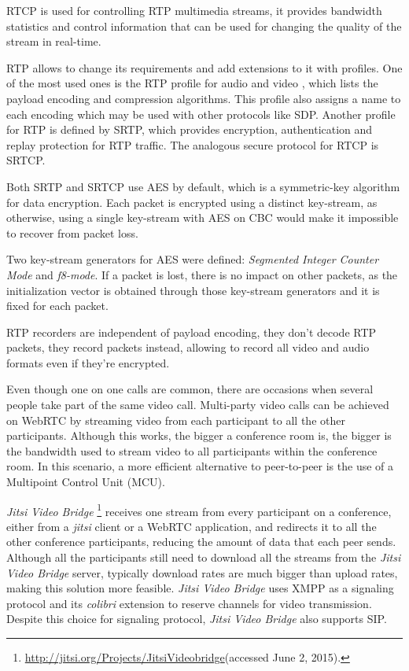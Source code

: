 \ac{RTCP} is used for controlling \ac{RTP} multimedia streams, it provides bandwidth statistics and control information that can be used for changing the quality of the stream in real-time.

  \ac{RTP} allows to change its requirements and add extensions to it with profiles. One of the most used ones is the \ac{RTP} profile for audio and video \cite{rfc3551}, which lists the payload encoding and compression algorithms. This profile also assigns a name to each encoding which may be used with other protocols like \ac{SDP}.
  Another profile for \ac{RTP} is defined by \ac{SRTP}, which provides encryption, authentication and replay protection for \ac {RTP} traffic. The analogous secure protocol for \ac{RTCP} is \ac{SRTCP}.

  Both \ac{SRTP} and \ac{SRTCP} use \ac{AES} by default, which is a symmetric-key algorithm for data encryption. Each packet is encrypted using a distinct key-stream, as otherwise, using a single key-stream with \ac{AES} on \ac{CBC} would make it impossible to recover from packet loss.

  Two key-stream generators for \ac{AES} were defined: \emph{Segmented Integer Counter Mode} and \emph{f8-mode}. If a packet is lost, there is no impact on other packets, as the initialization vector is obtained through those key-stream generators and it is fixed for each packet.


  \ac{RTP} recorders are independent of payload encoding, they don't decode \ac{RTP} packets, they record packets instead, allowing to record all video and audio formats even if they're encrypted.

        Even though one on one calls are common, there are occasions when several people take part of the same video call.
	Multi-party video calls can be achieved on \ac{WebRTC} by streaming video from each participant to all the other participants. Although this works, the bigger a conference room is, the bigger is the bandwidth used to stream video to all participants within the conference room.
        In this scenario, a more efficient alternative to peer-to-peer is the use of a Multipoint Control Unit (MCU).

	\emph{Jitsi Video Bridge} \footnote{\url{http://jitsi.org/Projects/JitsiVideobridge}(accessed June 2, 2015).} receives one stream from every participant on a conference, either from a \emph{jitsi} client or a \ac{WebRTC} application, and redirects it to all the other conference participants, reducing the amount of data that each peer sends. Although all the participants still need to download all the streams from the \emph{Jitsi Video Bridge} server, typically download rates are much bigger than upload rates, making this solution more feasible.
	\emph{Jitsi Video Bridge} uses \ac{XMPP} as a signaling protocol and its \emph{colibri} extension \cite{xep0340} to reserve channels for video transmission. Despite this choice for signaling protocol, \emph{Jitsi Video Bridge} also supports \ac{SIP}.



